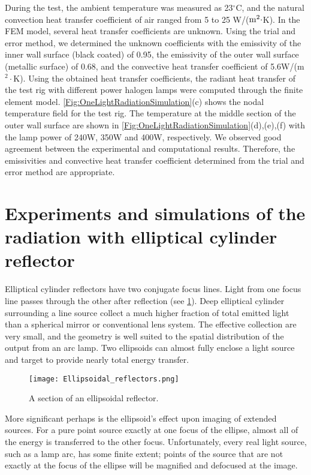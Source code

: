 During the test, the ambient temperature was measured as 23$^{\circ}$C, and the natural convection heat transfer coefficient of air ranged from 5 to 25 W/(${\rm{m}}^2\cdot$K).
In the FEM model, several heat transfer coefficients are unknown.
Using the trial and error method, we determined the unknown coefficients with the emissivity of the inner wall surface (black coated) of 0.95, the emissivity of the outer wall surface (metallic surface) of 0.68, and the convective heat transfer coefficient of 5.6W/(m$^2\cdot$K).
Using the obtained heat transfer coefficients, the radiant heat transfer of the test rig with different power halogen lamps were computed through the finite element model. 
\ref{Fig:OneLightRadiationSimulation}(c) shows the nodal temperature field for the test rig. 
The temperature at the middle section of the outer wall surface are shown in \ref{Fig:OneLightRadiationSimulation}(d),(e),(f) with the lamp power of 240W, 350W and 400W, respectively.
We observed good agreement between the experimental and computational results.
Therefore, the emissivities and convective heat transfer coefficient determined from the trial and error method are appropriate.




\section{Experiments and simulations of the radiation with elliptical cylinder reflector}
\noindent
Elliptical cylinder reflectors have two conjugate focus lines. Light from one focus line passes through the other after reflection (see \ref{Fig:EllipsoidalReflectors}).
Deep elliptical cylinder surrounding a line source collect a much higher fraction of total emitted light than a spherical mirror or conventional lens system.
The effective collection are very small, and the geometry is well suited to the spatial distribution of the output from an arc lamp.
Two ellipsoids can almost fully enclose a light source and target to provide nearly total energy transfer.
\begin{figure}[!htp]
	\centering
	\texttt{[image: Ellipsoidal\_reflectors.png]}
	\caption{A section of an ellipsoidal reflector. }
	\label{Fig:EllipsoidalReflectors}
\end{figure}
More significant perhaps is the ellipsoid's effect upon imaging of extended sources.
For a pure point source exactly at one focus of the ellipse, almost all of the energy is transferred to the other focus.
Unfortunately, every real light source, such as a lamp arc, has some finite extent; points of the source that are not exactly at the focus of the ellipse will be magnified and defocused at the image.

